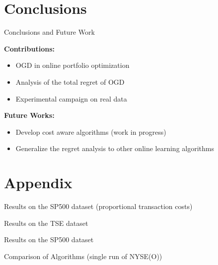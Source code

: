 \documentclass[10pt]{beamer}
\begin{document}
\section{Conclusions}

\begin{frame}{Conclusions and Future Work}

\textbf{Contributions:}
\begin{itemize}
\item OGD in online portfolio optimization
\item Analysis of the total regret of OGD
\item Experimental campaign on real data
\end{itemize}

\textbf{Future Works:}

\begin{itemize}
  \item Develop cost aware algorithms (work in progress)
  \item Generalize the regret analysis to other online learning algorithms
\end{itemize}

\end{frame}

\begin{frame}[allowframebreaks]
  
  
  

\end{frame}

\section{Appendix}

\appendix

\begin{frame}{Results on the SP500 dataset (proportional transaction costs)}

\begin{figure}[t!]
    
\end{figure}
\end{frame}

\begin{frame}{Results on the TSE dataset}

\begin{figure}[t!]
    
\end{figure}

\end{frame}

\begin{frame}{Results on the SP500 dataset}

\begin{figure}[t!]
    
\end{figure}

\end{frame}

\begin{frame}{Comparison of Algorithms (single run of NYSE(O))}

\begin{figure}[t!]
    
\end{figure}

\end{frame}
\end{document}
